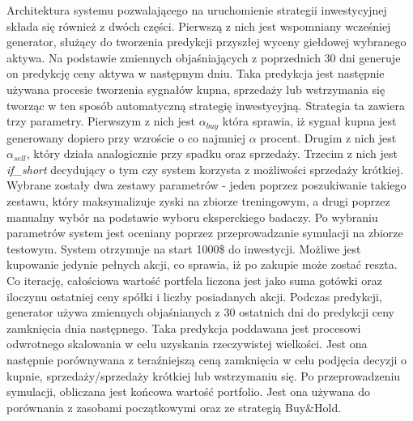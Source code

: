 \documentclass[11pt]{article} %
\begin{document}
Architektura systemu  pozwalającego na uruchomienie strategii inwestycyjnej składa się również z dwóch części. Pierwszą z nich jest wspomniany wcześniej generator, służący do tworzenia predykcji przyszłej wyceny giełdowej wybranego aktywa. Na podstawie zmiennych objaśniających z poprzednich 30 dni generuje on predykcję ceny aktywa w następnym dniu. Taka predykcja jest następnie używana procesie tworzenia sygnałów kupna, sprzedaży lub wstrzymania się tworząc w ten sposób automatyczną strategię inwestycyjną. Strategia ta zawiera trzy parametry. Pierwszym z nich jest $\alpha_{buy}$ która sprawia, iż sygnał kupna jest generowany dopiero przy wzroście o co najmniej $\alpha$ procent. Drugim z nich jest  $\alpha_{sell}$, który działa analogicznie przy spadku oraz sprzedaży. Trzecim z nich jest \textit{if\_short} decydujący o tym czy system korzysta z możliwości sprzedaży krótkiej. Wybrane zostały dwa zestawy parametrów - jeden poprzez poszukiwanie takiego zestawu, który maksymalizuje zyski na zbiorze treningowym, a drugi poprzez manualny wybór na podstawie wyboru eksperckiego badaczy. Po wybraniu parametrów system jest oceniany poprzez przeprowadzanie symulacji na zbiorze testowym. System otrzymuje na start 1000\$ do inwestycji. Możliwe jest kupowanie jedynie pełnych akcji, co sprawia, iż po zakupie może zostać reszta. Co iterację, całościowa wartość portfela liczona jest jako suma gotówki oraz iloczynu ostatniej ceny spółki i liczby posiadanych akcji.  Podczas predykcji, generator używa zmiennych objaśnianych z 30 ostatnich dni do predykcji ceny zamknięcia dnia następnego. Taka predykcja poddawana jest procesowi odwrotnego skalowania w celu uzyskania rzeczywistej wielkości. Jest ona następnie porównywana z teraźniejszą ceną zamknięcia w celu podjęcia decyzji o kupnie, sprzedaży/sprzedaży krótkiej lub wstrzymaniu się. Po przeprowadzeniu symulacji, obliczana jest końcowa wartość portfolio. Jest ona używana do porównania z zasobami początkowymi oraz ze strategią Buy\&Hold.
\end{document}
